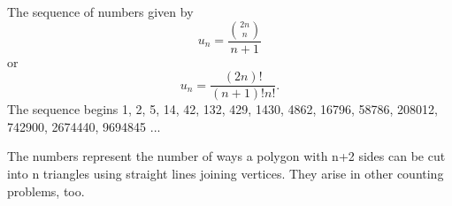 The sequence of numbers given by 
$$ 
u_n = \frac{{2n \choose n}}{n+1} 
$$ 
or 
$$ 
u_n = \frac{(2n )! }{( n+1 )! n!}. 
$$
The sequence begins 1, 2, 5, 14, 42, 132, 429, 1430, 4862, 16796, 58786, 208012, 
742900, 2674440, 9694845 ...
\par
The numbers represent the number of ways a polygon with n+2 sides can be cut 
into n triangles using straight lines joining vertices. They arise in other
counting problems, too.